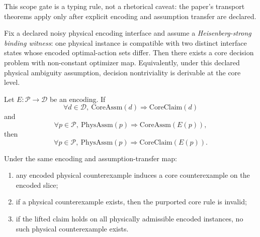 This scope gate is a typing rule, not a rhetorical caveat: the paper's transport theorems apply only after explicit encoding and assumption transfer are declared.

\begin{proposition}\label{prop:heisenberg-strong-nontrivial-opt}
Fix a declared noisy physical encoding interface and assume a \emph{Heisenberg-strong binding witness}: one physical instance is compatible with two distinct interface states whose encoded optimal-action sets differ.
Then there exists a core decision problem with non-constant optimizer map.
Equivalently, under this declared physical ambiguity assumption, decision nontriviality is derivable at the core level.
\end{proposition}

\begin{proposition}\label{prop:physical-claim-transport}
Let $E:\mathcal{P}\to\mathcal{D}$ be an encoding. If
\[
\forall d\in\mathcal{D},\ \mathrm{CoreAssm}(d)\Rightarrow \mathrm{CoreClaim}(d)
\]
and
\[
\forall p\in\mathcal{P},\ \mathrm{PhysAssm}(p)\Rightarrow \mathrm{CoreAssm}(E(p)),
\]
then
\[
\forall p\in\mathcal{P},\ \mathrm{PhysAssm}(p)\Rightarrow \mathrm{CoreClaim}(E(p)).
\]
\end{proposition}

\begin{corollary}\label{cor:physical-counterexample-core-failure}
Under the same encoding and assumption-transfer map:
\begin{enumerate}
\item any encoded physical counterexample induces a core counterexample on the encoded slice;
\item if a physical counterexample exists, then the purported core rule is invalid;
\item if the lifted claim holds on all physically admissible encoded instances, no such physical counterexample exists.
\end{enumerate}
\end{corollary}

